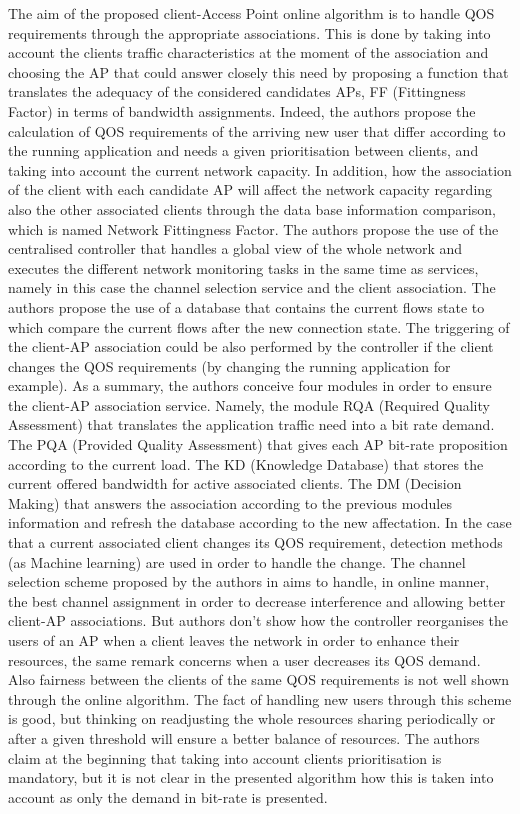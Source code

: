 \documentclass[journal,transmag]{IEEEtran}
\begin{document}
The aim of the proposed client-Access Point online algorithm is to handle QOS requirements through the appropriate associations. This is done by taking into account the clients traffic characteristics at the moment of the association and choosing the AP that could answer closely this need by proposing a function that translates the adequacy of the considered candidates APs, FF (Fittingness Factor) in terms of bandwidth assignments. Indeed, the authors propose the calculation of QOS requirements of the arriving new user that differ according to the running application and needs a given prioritisation between clients, and taking into account the current network capacity. In addition, how the association of the client with each candidate AP will affect the network capacity regarding also the other associated clients through the data base information comparison, which is named Network Fittingness Factor. The authors propose the use of the centralised controller that handles a global view of the whole network and executes the different network monitoring tasks in the same time as services, namely in this case the channel selection service and the client association. The authors propose the use of a database that contains the current flows state to which compare the current flows after the new connection state. The triggering of the client-AP association could be also performed by the controller if the client changes the QOS requirements (by changing the running application for example). As a summary, the authors conceive four modules in order to ensure the client-AP association service. Namely, the module RQA (Required Quality Assessment) that translates the application traffic need into a bit rate demand. The PQA (Provided Quality Assessment) that gives each AP bit-rate proposition according to the current load. The KD (Knowledge Database) that stores the current offered bandwidth for active associated clients. The DM (Decision Making) that answers the association according to the previous modules information and refresh the database according to the new affectation. In the case that a current associated client changes its QOS requirement, detection methods (as Machine learning) are used in order to handle the change. The channel selection scheme proposed by the authors in \cite{16SDN_based_channel_assignement} aims to handle, in online manner, the best channel assignment in order to decrease interference and allowing better client-AP associations. But authors don't show how the controller reorganises the users of an AP when a client leaves the network in order to enhance their resources, the same remark concerns when a user decreases its QOS demand. Also fairness between the clients of the same QOS requirements is not well shown through the online algorithm. The fact of handling new users through this scheme is good, but thinking on readjusting the whole resources sharing periodically or after a given threshold will ensure a better balance of resources. The authors claim at the beginning that taking into account clients prioritisation is mandatory, but it is not clear in the presented algorithm how this is taken into account as only the demand in bit-rate is presented.\\
\end{document}
